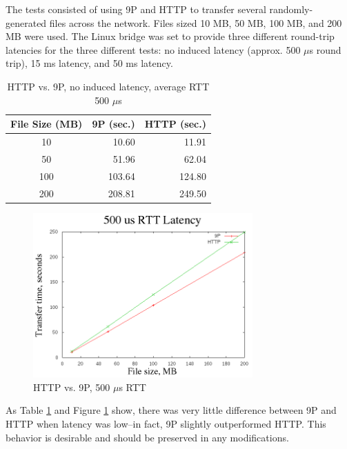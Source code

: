 \documentclass[11pt,american]{report}
\begin{document}
The tests consisted of using 9P and HTTP to transfer several randomly-generated files across the network. Files sized 10 MB, 50 MB, 100 MB, and 200 MB were used. The Linux bridge was set to provide three different round-trip latencies for the three different tests: no induced latency (approx. 500 $\mu$s round trip), 15 ms latency, and 50 ms latency.

\begin{table}[h]
	\caption{HTTP vs. 9P, no induced latency, average RTT 500 $\mu$s}
	\begin{center}
		\begin{tabular}{ | c || r | r | }
			\hline
			\bf{File Size (MB)} & \bf{9P (sec.)} & \bf{HTTP (sec.)} \\ \hline
			10 & 10.60 & 11.91 \\ \hline
			50 & 51.96 & 62.04 \\ \hline
			100 & 103.64 & 124.80 \\ \hline
			200 & 208.81 & 249.50 \\ \hline		
		\end{tabular}
	\end{center}
	\label{table:nolatency}
\end{table}

\begin{figure}[h]
	\begin{center}
		\includegraphics[width=0.75\textwidth]{500us.png}
	\end{center}
	\caption{HTTP vs. 9P, 500 $\mu$s RTT}
	\label{figure:500us}
\end{figure}

As Table \ref{table:nolatency} and Figure \ref{figure:500us} show, there was very little difference between 9P and HTTP when latency was low--in fact, 9P slightly outperformed HTTP. This behavior is desirable and should be preserved in any modifications.
\end{document}

